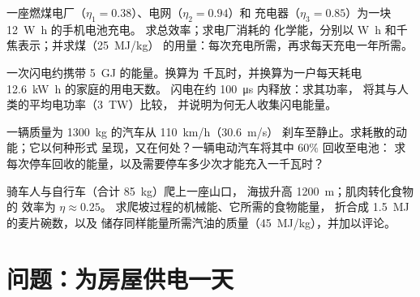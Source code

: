\begin{exercise}[$\star\star\star$]\label{exo:g10:energy-conservation:12}
一座燃煤电厂（$\eta_1 = 0.38$）、电网（$\eta_2 = 0.94$）和
充电器（$\eta_3 = 0.85$）为一块 \qty{12}{W.h} 的手机电池充电。
求总效率；求电厂消耗的
化学能，分别以 \unit{W.h} 和千焦表示；并求煤（\qty{25}{MJ/kg}）
的用量：每次充电所需，再求每天充电一年所需。
\end{exercise}

\begin{exercise}[$\star\star\star$]\label{exo:g10:energy-conservation:13}
一次闪电约携带 \qty{5}{GJ} 的能量。换算为
千瓦时，并换算为一户每天耗电 \qty{12.6}{kW.h} 的家庭的用电天数。
闪电在约 \qty{100}{\micro s} 内释放：求其功率，
将其与人类的平均电功率（\qty{3}{TW}）比较，
并说明为何无人收集闪电能量。
\end{exercise}

\begin{exercise}[$\star\star\star$]\label{exo:g10:energy-conservation:14}
一辆质量为 \qty{1300}{kg} 的汽车从 \qty{110}{km/h}（\qty{30.6}{m/s}）
刹车至静止。求耗散的动能；它以何种形式
呈现，又在何处？一辆电动汽车将其中 $60\%$ 回收至电池：
求每次停车回收的能量，以及需要停车多少次才能充入一千瓦时？
\end{exercise}

\begin{exercise}[$\star\star\star$]\label{exo:g10:energy-conservation:15}
骑车人与自行车（合计 \qty{85}{kg}）爬上一座山口，
海拔升高 \qty{1200}{m}；肌肉转化食物的
效率为 $\eta \approx 0.25$。
求爬坡过程的机械能、它所需的食物能量，
折合成 \qty{1.5}{MJ} 的麦片碗数，以及
储存同样能量所需汽油的质量（\qty{45}{MJ/kg}），并加以评论。
\end{exercise}

\section{问题：为房屋供电一天}


